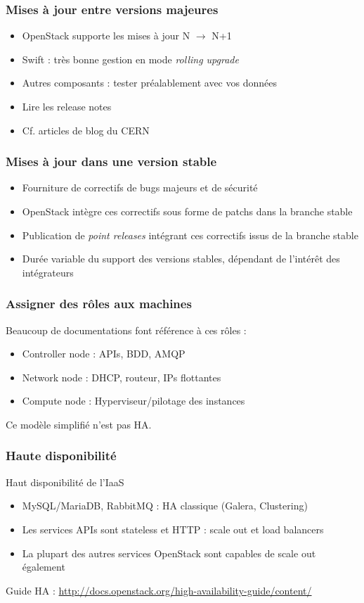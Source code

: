   \begin{frame}
    \frametitle{Mises à jour entre versions majeures}
    \begin{itemize}
      \item OpenStack supporte les mises à jour N $\rightarrow$ N+1
      \item Swift : très bonne gestion en mode \textit{rolling upgrade}
      \item Autres composants : tester préalablement avec vos données
      \item Lire les release notes
      \item Cf. articles de blog du CERN
    \end{itemize}
  \end{frame}

  \begin{frame}
    \frametitle{Mises à jour dans une version stable}
    \begin{itemize}
      \item Fourniture de correctifs de bugs majeurs et de sécurité
      \item OpenStack intègre ces correctifs sous forme de patchs dans la branche stable
      \item Publication de \textit{point releases} intégrant ces correctifs issus de la branche stable
      \item Durée variable du support des versions stables, dépendant de l'intérêt des intégrateurs
    \end{itemize}
  \end{frame}

  \begin{frame}
    \frametitle{Assigner des rôles aux machines}
    Beaucoup de documentations font référence à ces rôles :
    \begin{itemize}
      \item Controller node : APIs, BDD, AMQP
      \item Network node : DHCP, routeur, IPs flottantes
      \item Compute node : Hyperviseur/pilotage des instances
    \end{itemize}
    Ce modèle simplifié n'est pas HA.
  \end{frame}

  \begin{frame}
    \frametitle{Haute disponibilité}
    Haut disponibilité de l'IaaS
    \begin{itemize}
      \item MySQL/MariaDB, RabbitMQ : HA classique (Galera, Clustering)
      \item Les services APIs sont stateless et HTTP : scale out et load balancers
      \item La plupart des autres services OpenStack sont capables de scale out également
    \end{itemize}
    Guide HA : \url{http://docs.openstack.org/high-availability-guide/content/}
  \end{frame}

